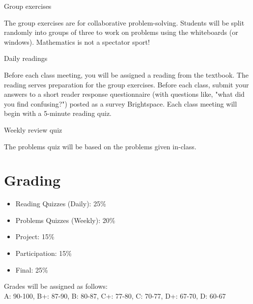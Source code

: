 \documentclass[letterpaper]{inzane_syllabus} %
\begin{document}

\vspace{0.1cm} 

{\color{myCOLOR} Group exercises}

The group exercises are for collaborative problem-solving.  Students will be split randomly into groups of three to work on problems using the whiteboards (or windows). Mathematics is not a spectator sport!

{\color{myCOLOR} Daily readings}

Before each class meeting, you will be assigned a reading from the textbook. The reading serves preparation for the group exercises. Before each class, submit your answers to a short reader response questionnaire (with questions like, "what did you find confusing?") posted as a survey Brightspace.  Each class meeting will begin with a 5-minute reading quiz.


{\color{myCOLOR} Weekly review quiz}

The problems quiz will be based on the problems given in-class.



\newpage %

\makeSide %


\vspace{0.2cm}
\section{Grading}

\begin{itemize}
\item Reading Quizzes (Daily): 25\%  
\item Problems Quizzes (Weekly): 20\% 
\item Project: 15\% 
\item Participation: 15\% 
\item Final: 25\%
\end{itemize}

Grades will be assigned as follows: \\
A: 90-100, B+: 87-90, B: 80-87, C+: 77-80, C: 70-77, D+: 67-70, D: 60-67
\end{document}
